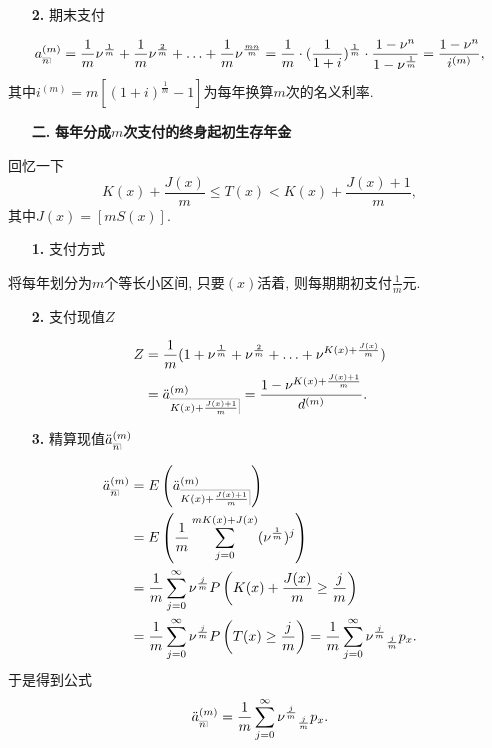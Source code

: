 \documentclass[a4paper,openany, 10pt]{ctexbook}
\makeatletter
\newcommand{\hei}{\CJKfamily{hei}}      %
\def\z{\left}
\def\y{\right}
\DeclareRobustCommand{\annu}[1]{_{%
    \def\arraystretch{0}%
    \setlength\arraycolsep{1pt}%
    \setlength\arrayrulewidth{.2pt}%
    \begin{array}[b]{@{}c|}\hline
        \\[\arraycolsep]%
        \scriptstyle #1%
    \end{array}%
}}
\makeatother
\begin{document}
\begin{itemize}
    \item[{\bf\hei 2.}] 期末支付
\end{itemize}
\begin{align*}
    a_{\annu{n}}^{(m)} = \frac1m \nu^{\frac1m} + \frac1m \nu^{\frac2m} + \ldots + \frac1m\nu^{\frac{mn}m} = \frac1m \cdot (\frac{1}{1+i})^{\frac1m} \cdot \frac{1-\nu^n}{1-\nu^{\frac1m}} = \frac{1-\nu^n}{i^{(m)}},
\end{align*}
其中$i^{(m)} = m[(1+i)^{\frac1m}-1]$为每年换算$m$次的名义利率.

\begin{itemize}
    \item[{\bf\hei 二.}]{\bf\hei 每年分成$m$次支付的终身起初生存年金}
\end{itemize}
回忆一下
$$ K(x) + \frac{J(x)}{m} \leq T(x) < K(x) + \frac{J(x)+1}{m},$$
其中$J(x) = [mS(x)].$
\begin{itemize}
    \item[{\bf\hei 1.}] 支付方式
\end{itemize}

将每年划分为$m$个等长小区间, 只要$(x)$活着, 则每期期初支付$\frac1m$元.

\begin{itemize}
    \item[{\bf\hei 2.}] 支付现值$Z$
\end{itemize}
\begin{align*}
  Z &= \frac1m(1+\nu^{\frac1m} + \nu^{\frac2m} + \ldots + \nu^{K(x)+\frac{J(x)}{m}}) \\
  &= \ddot a_{\annu{K(x)+\frac{J(x)+1}{m}}}^{(m)}= \frac{1-\nu^{K(x)+\frac{J(x)+1}{m}}}{d^{(m)}}.
\end{align*}
\begin{itemize}
    \item[{\bf\hei 3.}] 精算现值$\ddot{a}_{\annu{n}}^{(m)}$
\end{itemize}
\begin{align*}
    \ddot{a}_{\annu{n}}^{(m)} & = E\z(\ddot a_{\annu{K(x)+\frac{J(x)+1}{m}}}^{(m)}\y)                                                                             \\
                              & = E\z(\frac1m \sum_{j=0}^{mK(x)+J(x)} (\nu^\frac{1}m)^j\y)                                                                          \\
                              & = \frac1m \sum_{j=0}^{\infty} \nu^\frac{j}m P\z(K(x)+\frac{J(x)}m \geq \frac{j}{m}\y)                                               \\
                              & = \frac1m \sum_{j=0}^{\infty} \nu^\frac{j}m P\z(T(x)\geq \frac{j}{m}\y) = \frac1m \sum_{j=0}^{\infty} \nu^\frac{j}m {}_{\frac{j}m}p_x.
\end{align*}
于是得到公式
$$\ddot{a}_{\annu{n}}^{(m)}=\frac1m \sum_{j=0}^{\infty} \nu^\frac{j}m {}_{\frac{j}m}p_x.$$
\end{document}
